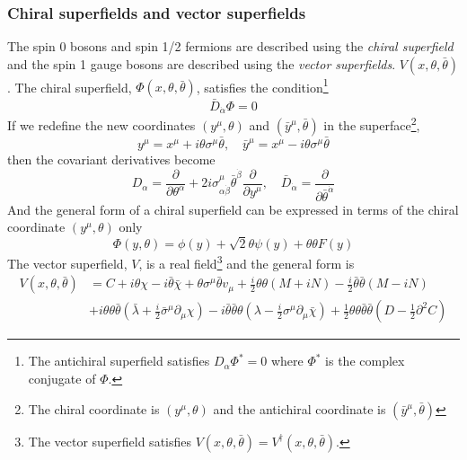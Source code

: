 
\subsubsection{Chiral superfields and vector superfields}
\label{subsec:susy_chiral_superfields_and_vector_superfields}
The spin 0 bosons and spin 1/2 fermions are described using the \textit{chiral superfield} and the spin 1 gauge bosons are described using the \textit{vector superfields}. $V(x, \theta, \bar{\theta})$.
The chiral superfield, $\Phi(x, \theta, \bar{\theta})$, satisfies the condition\footnote{The antichiral superfield satisfies $D_{\alpha}\Phi^{*} = 0$ where $\Phi^{*}$ is the complex conjugate of $\Phi$.}
%
\begin{equation}
\bar{D}_{\dot{\alpha}} \Phi = 0
\label{eq:susy_chiral_superfield_condition}
\end{equation}
%
If we redefine the new coordinates $(y^{\mu}, \theta)$ and $(\bar{y}^{\mu}, \bar{\theta})$ in the superface\footnote{The chiral coordinate is $(y^{\mu}, \theta)$ and the antichiral coordinate is $(\bar{y}^{\mu}, \bar{\theta})$},
%
\begin{equation}
y^{\mu} = x^{\mu} + i \theta \sigma^{\mu} \bar{\theta}, \quad \bar{y}^{\mu} = x^{\mu} - i \theta \sigma^{\mu} \bar{\theta}
\label{eq:susy_chiral_coordinate}
\end{equation}
%
then the covariant derivatives become
%
\begin{equation}
D_{\alpha} = \frac{\partial}{\partial \theta^{\alpha}} + 2i \sigma^{\mu}_{\alpha \dot{\beta}} \bar{\theta}^{\dot{\beta}} \frac{\partial}{\partial y^{\mu}}, \quad \bar{D}_{\dot{\alpha}} = \frac{\partial}{\partial \bar{\theta}^{\dot{\alpha}}}
\label{eq:susy_chiral_covariant_derivative}
\end{equation}
%
And the general form of a chiral superfield can be expressed in terms of the chiral coordinate $(y^{\mu}, \theta)$ only
%
\begin{equation}
\Phi(y, \theta) = \phi(y) + \sqrt{2} \theta \psi(y) + \theta \theta F(y)
\label{eq:susy_chiral_superfield_general_form}
\end{equation}
%
The vector superfield, $V$, is a real field\footnote{The vector superfield satisfies $V(x, \theta, \bar{\theta}) = V^{\dagger}(x, \theta, \bar{\theta})$.} and the general form is
%
\begin{align}
V(x, \theta, \bar{\theta}) &= C + i \theta \chi - i \bar{\theta} \bar{\chi} + \theta \sigma^{\mu} \bar{\theta} v_{\mu} + \frac{i}{2} \theta \theta (M + iN) - \frac{i}{2} \bar{\theta} \bar{\theta}(M - iN)\\
&+ i \theta \theta \bar{\theta} (\bar{\lambda} + \frac{i}{2} \bar{\sigma}^{\mu} \partial_{\mu} \chi) - i \bar{\theta} \bar{\theta} \theta (\lambda - \frac{i}{2} \sigma^{\mu} \partial_{\mu} \bar{\chi}) + \frac{1}{2} \theta \theta \bar{\theta} \bar{\theta} (D - \frac{1}{2} \partial^{2} C)
\label{eq:susy_vector_superfield_general_form}
\end{align}
